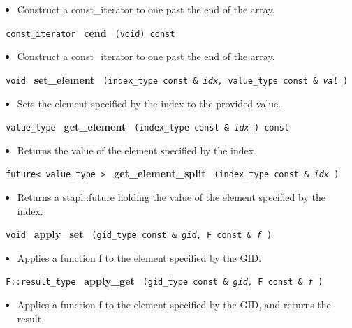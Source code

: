 \begin{itemize}
\item
Construct a const\_iterator to one past the end of the array.
\end{itemize}
 
\noindent
\texttt{%
const\_iterator
}
\textbf{cend}%
\texttt{%
(void) const
}

\begin{itemize}
\item
Construct a const\_iterator to one past the end of the array.
\end{itemize}
 
\noindent
\texttt{%
void
}
\textbf{set\_element}%
\texttt{%
(index\_type const \&
\textit{idx,}%
value\_type const \&
\textit{val}%
)
}

\begin{itemize}
\item
Sets the element specified by the index to the provided value.
\end{itemize}
 
\noindent
\texttt{%
value\_type
}
\textbf{get\_element}%
\texttt{%
(index\_type const \&
\textit{idx}%
) const
}

\begin{itemize}
\item
Returns the value of the element specified by the index.
\end{itemize}
 
\noindent
\texttt{%
future< value\_type >
}
\textbf{get\_element\_split}%
\texttt{%
(index\_type const \&
\textit{idx}%
)
}

\begin{itemize}
\item
Returns a stapl::future holding the value of the element specified by the index.
\end{itemize}
 
\noindent
\texttt{%
void
}
\textbf{apply\_set}%
\texttt{%
(gid\_type const \&
\textit{gid,}%
F const \&
\textit{f}%
)
}

\begin{itemize}
\item
Applies a function f to the element specified by the GID.
\end{itemize}
 
\noindent
\texttt{%
F::result\_type
}
\textbf{apply\_get}%
\texttt{%
(gid\_type const \&
\textit{gid,}%
F const \&
\textit{f}%
)
}

\begin{itemize}
\item
Applies a function f to the element specified by the GID, and returns the result.
\end{itemize}
 

